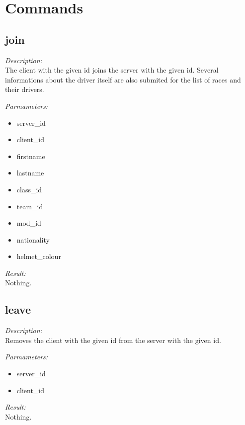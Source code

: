 \section{Commands}

\subsection{join}

\begin{description}
\item {\it Description:}\\
The client with the given id joins the server with the given id. Several informations about the driver itself are also submited for the list of races and their drivers.
\item {\it Parmameters:}
\begin{itemize}
\item server\_id
\item client\_id
\item firstname
\item lastname
\item class\_id
\item team\_id
\item mod\_id
\item nationality
\item helmet\_colour
\end{itemize}
\item {\it Result:}\\
Nothing.
\end{description}

\subsection{leave}

\begin{description}
\item {\it Description:}\\
Removes the client with the given id from the server with the given id.
\item {\it Parmameters:}
\begin{itemize}
\item server\_id
\item client\_id
\end{itemize}
\item {\it Result:}\\
Nothing.
\end{description}

